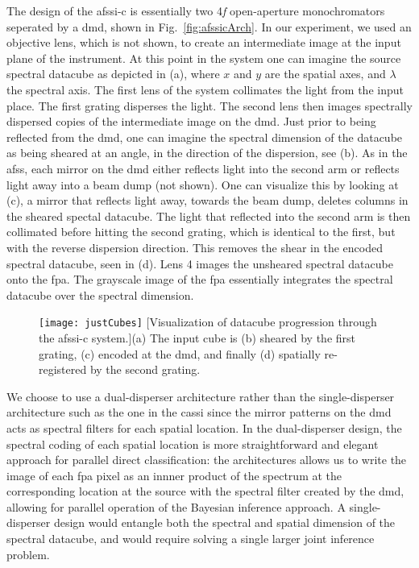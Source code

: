 The design of the \gls{afssi-c} is essentially two 4\textit{f} open-aperture monochromators seperated by a \acrfull{dmd}, shown in Fig.~\ref{fig:afssicArch}. In our experiment, we used an objective lens, which is not shown, to create an intermediate image at the input plane of the instrument. At this point in the system one can imagine the source spectral datacube as depicted in (a), where $x$ and $y$ are the spatial axes, and $\lambda$ the spectral axis. The first lens of the system collimates the light from the input place. The first grating disperses the light. The second lens then images spectrally dispersed copies of the intermediate image on the \gls{dmd}. Just prior to being reflected from the \gls{dmd}, one can imagine the spectral dimension of the datacube as being sheared at an angle, in the direction of the dispersion, see (b). As in the \gls{afss}, each mirror on the \gls{dmd} either reflects light into the second arm or reflects light away into a beam dump (not shown). One can visualize this by looking at (c), a mirror that reflects light away, towards the beam dump, deletes columns in the sheared spectal datacube. The light that reflected into the second arm is then collimated before hitting the second grating, which is identical to the first, but with the reverse dispersion direction. This removes the shear in the encoded spectral datacube, seen in (d). Lens 4 images the unsheared spectral datacube onto the \gls{fpa}. The grayscale image of the \gls{fpa} essentially integrates the spectral datacube over the spectral dimension. 

\begin{figure}
	\texttt{[image: justCubes]}
	[Visualization of datacube progression through the \gls{afssi-c} system.]{(a) The input cube is (b) sheared by the first grating, (c) encoded at the \gls{dmd}, and finally (d) spatially re-registered by the second grating.}
	\label{fig:sysCubes}
\end{figure}

We choose to use a dual-disperser architecture rather than the single-disperser architecture such as the one in the \gls{cassi} since the mirror patterns on the \gls{dmd} acts as spectral filters for each spatial location. In the dual-disperser design, the spectral coding of each spatial location is more straightforward and elegant approach for parallel direct classification: the architectures allows us to write the image of each \gls{fpa} pixel as an innner product of the spectrum at the corresponding location at the source with the spectral filter created by the \gls{dmd}, allowing for parallel operation of the Bayesian inference approach. A single-disperser design would entangle both the spectral and spatial dimension of the spectral datacube, and would require solving a single larger joint inference problem.

